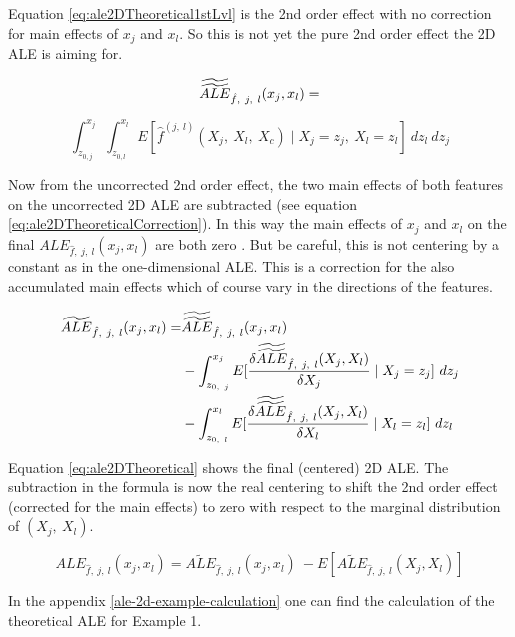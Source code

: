 \documentclass[]{krantz}
\begin{document}
Equation \eqref{eq:ale2DTheoretical1stLvl} is the 2nd order effect with no
correction for main effects of \(x_j\) and \(x_l\). So this is not yet
the pure 2nd order effect the 2D ALE is aiming for.

\begin{equation} 
\widetilde{\widetilde{ALE}}_{\hat{f},~j,~l}(x_j, x_l) = \notag
\end{equation}

\begin{equation}
\int_{z_{0,j}}^{x_j}  \int_{z_{0,l}}^{x_l} E[\hat{f}^{(j,~l)}(X_j,~X_l,~X_c)\mid X_j = z_j,~X_l = z_l]~dz_l~dz_j 
  \label{eq:ale2DTheoretical1stLvl}
\end{equation}

Now from the uncorrected 2nd order effect, the two main effects of both
features on the uncorrected 2D ALE are subtracted (see equation
\eqref{eq:ale2DTheoreticalCorrection}). In this way the main effects of
\(x_j\) and \(x_l\) on the final \(ALE_{\hat{f},~j,~l}(x_j, x_l)\) are
both zero \citep[page 9]{Apley2016}. But be careful, this is not
centering by a constant as in the one-dimensional ALE. This is a
correction for the also accumulated main effects which of course vary in
the directions of the features.

\begin{align}
\widetilde{ALE}_{\hat{f},~j,~l}(x_j, x_l) 
= &\widetilde{\widetilde{ALE}}_{\hat{f},~j,~l}(x_j, x_l) \notag \\ 
&-  \int_{z_{0,~j}}^{x_j}  E[\frac{\delta\widetilde{\widetilde{ALE}}_{\hat{f},~j,~l}(X_j, X_l)}{\delta X_j}\mid X_j = z_j]~dz_j \notag \\
&- \int_{z_{0,~l}}^{x_l}  E[\frac{\delta\widetilde{\widetilde{ALE}}_{\hat{f},~j,~l}(X_j, X_l)}{\delta X_l}\mid X_l = z_l]~dz_l
\label{eq:ale2DTheoreticalCorrection}
\end{align}

Equation \eqref{eq:ale2DTheoretical} shows the final (centered) 2D ALE.
The subtraction in the formula is now the real centering to shift the
2nd order effect (corrected for the main effects) to zero with respect
to the marginal distribution of \((X_j, ~ X_l)\).

\begin{equation} 
ALE_{\hat{f},~j,~l}(x_j, x_l) = \widetilde{ALE}_{\hat{f},~j,~l}(x_j, x_l) ~ -  E[\widetilde{ALE}_{\hat{f},~j,~l}(X_j, X_l)]
  \label{eq:ale2DTheoretical}
\end{equation}

In the appendix \ref{ale-2d-example-calculation} one can find the
calculation of the theoretical ALE for Example 1.
\end{document}

